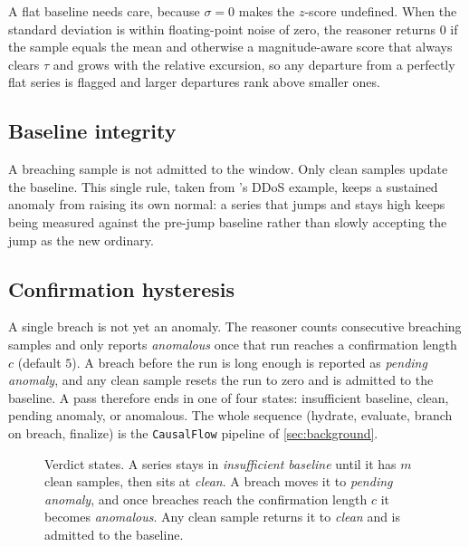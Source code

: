 A flat baseline needs care, because $\sigma = 0$ makes the $z$-score undefined.
When the standard deviation is within floating-point noise of zero, the reasoner
returns $0$ if the sample equals the mean and otherwise a magnitude-aware score
that always clears $\tau$ and grows with the relative excursion, so any departure
from a perfectly flat series is flagged and larger departures rank above smaller
ones.

\subsection{Baseline integrity}
A breaching sample is not admitted to the window. Only clean samples update the
baseline. This single rule, taken from \dc{}'s DDoS example, keeps a sustained
anomaly from raising its own normal: a series that jumps and stays high keeps being
measured against the pre-jump baseline rather than slowly accepting the jump as
the new ordinary.

\subsection{Confirmation hysteresis}
A single breach is not yet an anomaly. The reasoner counts consecutive breaching
samples and only reports \emph{anomalous} once that run reaches a confirmation
length $c$ (default $5$). A breach before the run is long enough is reported as
\emph{pending anomaly}, and any clean sample resets the run to zero and is admitted
to the baseline. A pass therefore ends in one of four states: insufficient
baseline, clean, pending anomaly, or anomalous. The whole sequence (hydrate,
evaluate, branch on breach, finalize) is the \texttt{CausalFlow} pipeline of
\cref{sec:background}.

\begin{figure}[t]
  \centering
  \caption{Verdict states. A series stays in \emph{insufficient baseline} until it
  has $m$ clean samples, then sits at \emph{clean}. A breach moves it to
  \emph{pending anomaly}, and once breaches reach the confirmation length $c$ it
  becomes \emph{anomalous}. Any clean sample returns it to \emph{clean} and is
  admitted to the baseline.}
  \label{fig:states}
\end{figure}


